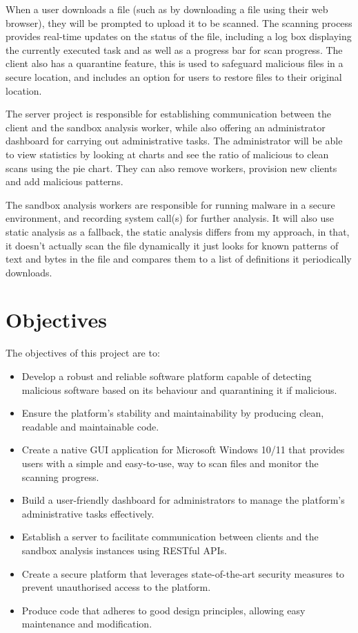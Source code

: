 When a user downloads a file
(such as by downloading a file using their web browser),
they will be prompted to upload it to be scanned.
The scanning process provides real-time updates on the status of the file,
including a log box displaying the currently executed task
and as well as a progress bar for scan progress.
The client also has a quarantine feature,
this is used to safeguard malicious files in a secure location,
and includes an option for users to restore files to their original location.

The server project is responsible for establishing communication
between the client and the sandbox analysis worker,
while also offering an administrator dashboard
for carrying out administrative tasks.
The administrator will be able to view statistics by looking at charts
and see the ratio of malicious to clean scans using the pie chart.
They can also remove workers, provision new clients and add malicious patterns.

The sandbox analysis workers are responsible for running malware in a secure environment,
and recording system call(s) for further analysis.
It will also use static analysis as a fallback,
the static analysis differs from my approach,
in that, it doesn't actually scan the file dynamically
it just looks for known patterns of text and bytes in the file
and compares them to a list of definitions it periodically downloads.


\section{Objectives}
The objectives of this project are to:
\begin{itemize}
\item Develop a robust and reliable software platform capable of detecting
      malicious software based on its behaviour and quarantining it if malicious.
\item Ensure the platform's stability and maintainability by producing clean,
      readable and maintainable code.
\item Create a native GUI application for Microsoft Windows 10/11
      that provides users with a simple and easy-to-use,
      way to scan files and monitor the scanning progress.
\item Build a user-friendly dashboard for administrators to manage
      the platform's administrative tasks effectively.
\item Establish a server to facilitate communication between
      clients and the sandbox analysis instances using RESTful APIs.
\item Create a secure platform that leverages state-of-the-art security
      measures to prevent unauthorised access to the platform.
\item Produce code that adheres to good design principles,
      allowing easy maintenance and modification.
\end{itemize}


